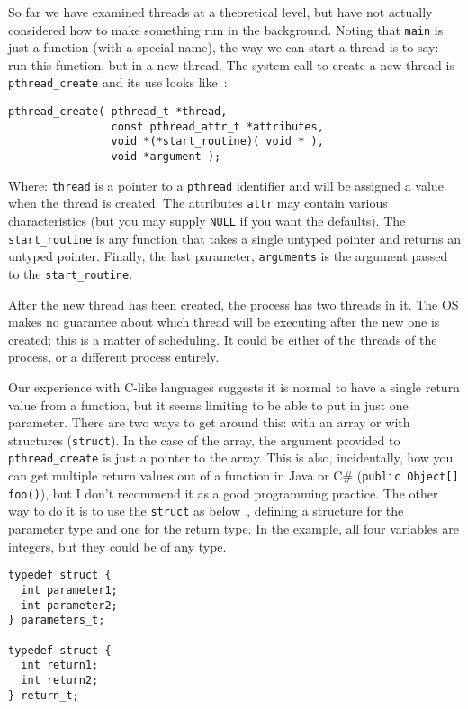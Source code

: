 So far we have examined threads at a theoretical level, but have not actually considered how to make something run in the background. Noting that \texttt{main} is just a function (with a special name), the way we can start a thread is to say: run this function, but in a new thread. The system call to create a new thread is \texttt{pthread\_create} and its use looks like~\cite{mte241}:

\begin{verbatim}
pthread_create( pthread_t *thread,
                const pthread_attr_t *attributes,
                void *(*start_routine)( void * ),
                void *argument );
\end{verbatim}

Where: \texttt{thread} is a pointer to a \texttt{pthread} identifier and will be assigned a value when the thread is created. The attributes \texttt{attr} may contain various characteristics (but you may supply \texttt{NULL} if you want the defaults). The \texttt{start\_routine} is any function that takes a single untyped pointer and returns an untyped pointer. Finally, the last parameter, \texttt{arguments} is the argument passed to the \texttt{start\_routine}.

After the new thread has been created, the process has two threads in it. The OS makes no guarantee about which thread will be executing after the new one is created; this is a matter of scheduling. It could be either of the threads of the process, or a different process entirely.

Our experience with C-like languages suggests it is normal to have a single return value from a function, but it seems limiting to be able to put in just one parameter. There are two ways to get around this: with an array or with structures (\texttt{struct}). In the case of the array, the argument provided to \texttt{pthread\_create} is just a pointer to the array. This is also, incidentally, how you can get multiple return values out of a function in Java or C\# (\texttt{public Object[] foo()}), but I don't recommend it as a good programming practice. The other way to do it is to use the \texttt{struct} as below~\cite{mte241}, defining a structure for the parameter type and one for the return type. In the example, all four variables are integers, but they could be of any type.

\begin{verbatim}
typedef struct {
  int parameter1;
  int parameter2;
} parameters_t;

typedef struct {
  int return1;
  int return2;
} return_t;
\end{verbatim}


